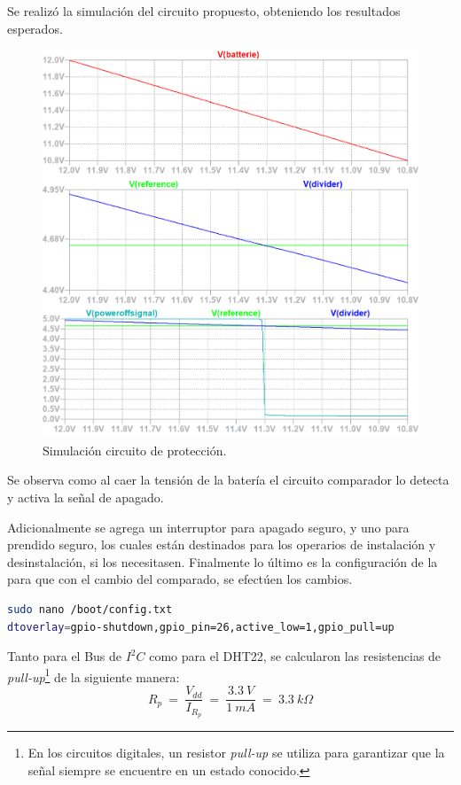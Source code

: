 Se realizó la simulación del circuito propuesto, obteniendo los resultados esperados.
\begin{figure}[H]
	\centering
    \includegraphics[width=0.9\linewidth]{ImagenesIngenieria de Detalle/Simulation}	
	\caption{Simulación circuito de protección.}
	\label{fig:sim}
\end{figure}

Se observa como al caer la tensión de la batería el circuito comparador lo detecta y activa la señal de apagado.

Adicionalmente se agrega un interruptor para apagado seguro, y uno para prendido seguro, los cuales están destinados para los operarios de instalación y desinstalación, si los necesitasen. 
Finalmente lo último es la configuración de la \rspi para que con el cambio del comparado, se efectúen los cambios.
\begin{lstlisting}[language=bash]
sudo nano /boot/config.txt 
dtoverlay=gpio-shutdown,gpio_pin=26,active_low=1,gpio_pull=up
\end{lstlisting} 

Tanto para el Bus de $I^2C$ como para el DHT22, se calcularon las resistencias de \textit{pull-up}\footnote{En los circuitos digitales, un resistor \textit{pull-up} se utiliza para garantizar que la señal siempre se encuentre en un estado conocido.} de la siguiente manera:
\begin{equation}
	R_p \ = \  \frac{V_{dd}}{I_{R_p}} \ = \ \frac{3.3 \ V}{1 \ mA} \ = \ 3.3 \ k\Omega  
\end{equation}

